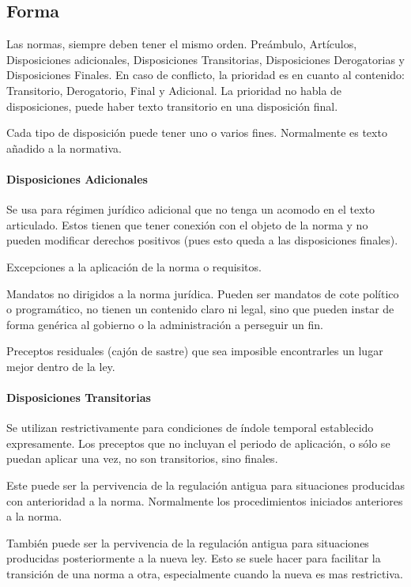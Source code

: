 \subsection{Forma}
Las normas, siempre deben tener el mismo orden. Preámbulo, Artículos, Disposiciones adicionales, Disposiciones Transitorias, Disposiciones Derogatorias y Disposiciones Finales. En caso de conflicto, la prioridad es en cuanto al contenido: Transitorio, Derogatorio, Final y Adicional. La prioridad no habla de disposiciones, puede haber texto transitorio en una disposición final.

Cada tipo de disposición puede tener uno o varios fines. Normalmente es texto añadido a la normativa.

\paragraph{Disposiciones Adicionales}
    Se usa para régimen jurídico adicional que no tenga un acomodo en el texto articulado. Estos tienen que tener conexión con el objeto de la norma y no pueden modificar derechos positivos (pues esto queda a las disposiciones finales).

    Excepciones a la aplicación de la norma o requisitos.

    Mandatos no dirigidos a la norma jurídica. Pueden ser mandatos de cote político o programático, no tienen un contenido claro ni legal, sino que pueden instar de forma genérica al gobierno o la administración a perseguir un fin.

    Preceptos residuales (cajón de sastre) que sea imposible encontrarles un lugar mejor dentro de la ley.

\paragraph{Disposiciones Transitorias}
    Se utilizan restrictivamente para condiciones de índole temporal establecido expresamente. Los preceptos que no incluyan el periodo de aplicación, o sólo se puedan aplicar una vez, no son transitorios, sino finales.
    
    Este puede ser la pervivencia de la regulación antigua para situaciones producidas con anterioridad a la norma. Normalmente los procedimientos iniciados anteriores a la norma.

    También puede ser la pervivencia de la regulación antigua para situaciones producidas posteriormente a la nueva ley. Esto se suele hacer para facilitar la transición de una norma a otra, especialmente cuando la nueva es mas restrictiva.

